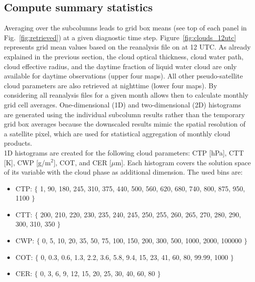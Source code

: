 \subsection{Compute summary statistics}

Averaging over the subcolumns leads to grid box means 
(see top of each panel in Fig.~\ref{fig:retrieved}) at a given diagnostic time step.
Figure~\ref{fig:clouds_12utc} represents grid mean values based on the 
reanalysis file on {\gcdate} at 12 UTC.
As already explained in the previous section, the cloud optical thickness, 
cloud water path, cloud effective radius, and the daytime fraction of liquid water cloud 
are only available for daytime observations (upper four maps). 
All other pseudo-satellite cloud parameters are also retrieved at nighttime 
(lower four maps).
By considering all reanalysis files for a given month allows then to calculate
monthly grid cell averages.
One-dimensional (1D) and two-dimensional (2D) histograms are generated using
the individual subcolumn results rather than the temporary grid box averages 
because the downscaled results mimic the spatial resolution of a satellite pixel, 
which are used for statistical aggregation of monthly cloud products.\\
1D histograms are created for the following cloud parameters: 
CTP [hPa], CTT [K], CWP [g/m$^{2}$], COT, and CER [$\mu$m]. 
Each histogram covers the solution space of its variable with the cloud phase as 
additional dimension. The used bins are:
\begin{itemize}\setlength\itemsep{0.2em}
 \item CTP: $\{$ 1, 90, 180, 245, 310, 375, 440, 500, 560, 620, 680, 740, 800, 875, 950, 1100 $\}$
 \item CTT: $\{$ 200, 210, 220, 230, 235, 240, 245, 250, 255, 260, 265, 270, 280, 290, 300, 310, 350 $\}$
 \item CWP: $\{$ 0, 5, 10, 20, 35, 50, 75, 100, 150, 200, 300, 500, 1000, 2000, 100000 $\}$ 
 \item COT: $\{$ 0, 0.3, 0.6, 1.3, 2.2, 3.6, 5.8, 9.4, 15, 23, 41, 60, 80, 99.99, 1000 $\}$
 \item CER: $\{$ 0, 3, 6, 9, 12, 15, 20, 25, 30, 40, 60, 80 $\}$ 
\end{itemize}

